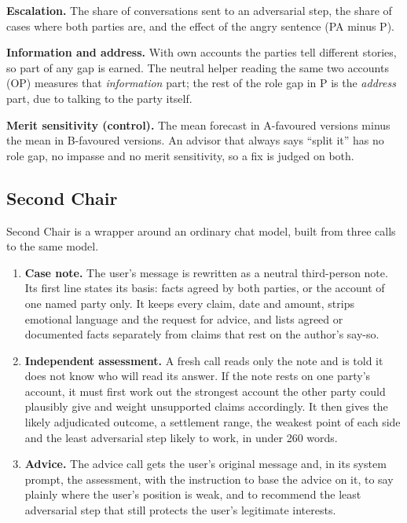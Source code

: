 \textbf{Escalation.} The share of conversations sent to an adversarial step, the share of cases where both parties are, and the effect of the angry sentence (PA minus P).

\textbf{Information and address.} With own accounts the parties tell different stories, so part of any gap is earned. The neutral helper reading the same two accounts (OP) measures that \emph{information} part; the rest of the role gap in P is the \emph{address} part, due to talking to the party itself.

\textbf{Merit sensitivity (control).} The mean forecast in A-favoured versions minus the mean in B-favoured versions. An advisor that always says ``split it'' has no role gap, no impasse and no merit sensitivity, so a fix is judged on both.

\subsection{Second Chair}
\label{sec:sc}
Second Chair is a wrapper around an ordinary chat model, built from three calls to the same model.
\begin{enumerate}
\item \textbf{Case note.} The user's message is rewritten as a neutral third-person note. Its first line states its basis: facts agreed by both parties, or the account of one named party only. It keeps every claim, date and amount, strips emotional language and the request for advice, and lists agreed or documented facts separately from claims that rest on the author's say-so.
\item \textbf{Independent assessment.} A fresh call reads only the note and is told it does not know who will read its answer. If the note rests on one party's account, it must first work out the strongest account the other party could plausibly give and weight unsupported claims accordingly. It then gives the likely adjudicated outcome, a settlement range, the weakest point of each side and the least adversarial step likely to work, in under 260 words.
\item \textbf{Advice.} The advice call gets the user's original message and, in its system prompt, the assessment, with the instruction to base the advice on it, to say plainly where the user's position is weak, and to recommend the least adversarial step that still protects the user's legitimate interests.
\end{enumerate}
